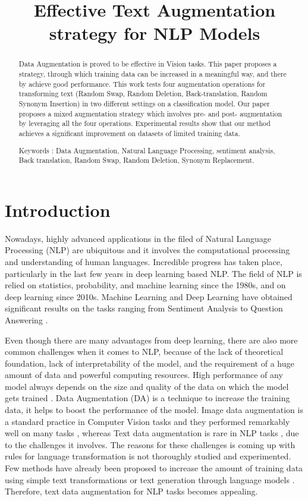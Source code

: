 \documentclass{article}
\title{Effective Text Augmentation strategy for NLP Models}
\begin{document}
\maketitle

\begin{abstract}
Data Augmentation is proved to be effective in Vision tasks. This paper proposes a strategy, through which training data can be increased in a meaningful way, and there by achieve good performance. This work tests four augmentation operations for transforming text (Random Swap, Random Deletion, Back-translation, Random Synonym Insertion) in two different settings on a classification model. Our paper proposes a mixed augmentation strategy which involves pre- and post- augmentation by leveraging all the four operations. Experimental results show that our method achieves a significant improvement on datasets of limited training data.

Keywords :  Data Augmentation, Natural Language Processing, sentiment analysis, Back translation, Random Swap, Random Deletion, Synonym Replacement.


\end{abstract}

 

\section{Introduction}
Nowadays, highly advanced applications in the filed of Natural Language Processing (NLP) are ubiquitous and it involves the computational processing and understanding of human languages. Incredible progress has taken place, particularly in the last few years in deep learning based NLP. The field of NLP is relied on statistics, probability, and machine learning since the 1980s, and on deep learning since 2010s\cite{otter2020survey}.  Machine Learning and Deep Learning have obtained significant results on the tasks ranging from Sentiment Analysis \cite{tang2015deep} to Question Answering \cite{malinowski2017ask}. 

Even though there are many advantages from deep learning, there are also more common challenges \cite{li2017deep} when it comes to NLP, because of the lack of theoretical foundation, lack of interpretability of the model, and the requirement of a huge amount of data and powerful computing resources. High performance of any model always depends on the size and quality of the data on which the model gets trained \cite{pepe2013testing}. Data Augmentation (DA) is a technique to increase the training data, it helps to boost the performance of the model. Image data augmentation is a standard practice in Computer Vision tasks and they performed remarkably well on many tasks \cite{perez2017effectiveness, shorten2019survey}, whereas Text data augmentation is rare in NLP tasks \cite{young2018recent}, due to the challenges it involves. The reasons for these challenges is coming up with rules for language transformation is not thoroughly studied and experimented. Few methods have already been proposed to increase the amount of training data using simple text transformations or text generation through language models \cite{abonizio2020pre}. Therefore, text data augmentation for NLP tasks becomes appealing.
\end{document}
